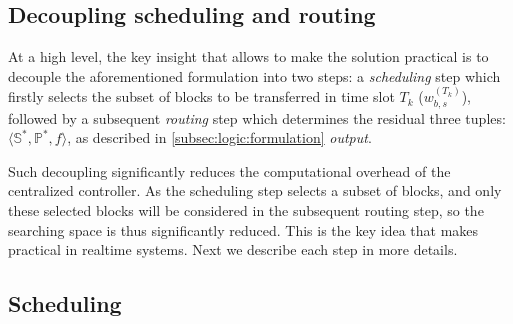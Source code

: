 \subsection{Decoupling scheduling and routing}
\label{subsec:logic:separation}

At a high level, the key insight that allows \name to make the solution practical is
to decouple the aforementioned formulation into two steps:
a {\em scheduling} step which firstly selects the subset of blocks to be transferred in time slot $T_k$
($w^{(T_k)}_{b,s}$), followed by a subsequent {\em routing}
step which determines the residual three tuples: $\langle \mathbb{S}^*, \mathbb{P}^*, f \rangle$, as described in \Section\ref{subsec:logic:formulation} {\em output}.

Such decoupling significantly reduces the computational overhead of the centralized controller. As the scheduling step selects a subset of blocks, and only these selected blocks will be considered in the subsequent routing step, so the searching space is thus significantly reduced. This is the key idea that makes \name practical in realtime systems.
Next we describe each step in more details.




\subsection{Scheduling}
\label{subsec:logic:scheduling}

